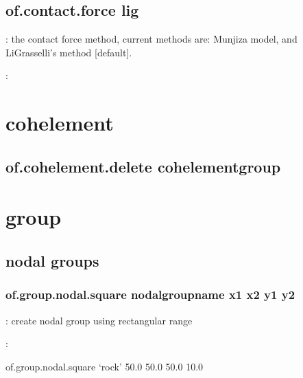 \documentclass[letterpaper,10pt,english]{sphinxmanual}
\begin{document}
\section{of.contact.force lig}
\label{\detokenize{rst_tutorials/command_line_guide:of-contact-force-lig}}
: the contact force method, current methods are: Munjiza model,
and Li\sphinxhyphen{}Grasselli’s method {[}default{]}.

:

\begin{sphinxVerbatim}[commandchars=\\\{\}]
 
\end{sphinxVerbatim}


\chapter{cohelement}
\label{\detokenize{rst_tutorials/command_line_guide:cohelement}}

\section{of.cohelement.delete cohelementgroup}
\label{\detokenize{rst_tutorials/command_line_guide:of-cohelement-delete-cohelementgroup}}

\chapter{group}
\label{\detokenize{rst_tutorials/command_line_guide:group}}

\section{nodal groups}
\label{\detokenize{rst_tutorials/command_line_guide:nodal-groups}}

\subsection{of.group.nodal.square nodalgroupname x1 x2 y1 y2}
\label{\detokenize{rst_tutorials/command_line_guide:of-group-nodal-square-nodalgroupname-x1-x2-y1-y2}}
: create nodal group using rectangular range

:

\begin{sphinxVerbatim}[commandchars=\\\{\}]
of.group.nodal.square ‘rock’ \PYGZhy{}50.0 50.0 \PYGZhy{}50.0 10.0
\end{sphinxVerbatim}
\end{document}
